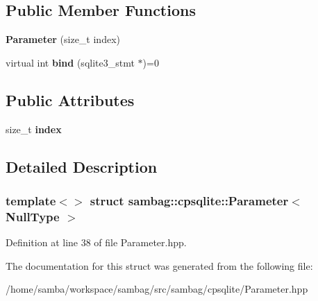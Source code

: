 \subsection*{Public Member Functions}
\begin{DoxyCompactItemize}
\item 
\hypertarget{structsambag_1_1cpsqlite_1_1_parameter_3_01_null_type_01_4_a1ea0b6f9d2697d99e6f2d6531f4bd075}{
{\bfseries Parameter} (size\_\-t index)}
\label{structsambag_1_1cpsqlite_1_1_parameter_3_01_null_type_01_4_a1ea0b6f9d2697d99e6f2d6531f4bd075}

\item 
\hypertarget{structsambag_1_1cpsqlite_1_1_parameter_3_01_null_type_01_4_a6d5826db5309ac05e7f267a4cf9835aa}{
virtual int {\bfseries bind} (sqlite3\_\-stmt $\ast$)=0}
\label{structsambag_1_1cpsqlite_1_1_parameter_3_01_null_type_01_4_a6d5826db5309ac05e7f267a4cf9835aa}

\end{DoxyCompactItemize}
\subsection*{Public Attributes}
\begin{DoxyCompactItemize}
\item 
\hypertarget{structsambag_1_1cpsqlite_1_1_parameter_3_01_null_type_01_4_a0f20eb15a9fa2a94b8ea1274ad76e99f}{
size\_\-t {\bfseries index}}
\label{structsambag_1_1cpsqlite_1_1_parameter_3_01_null_type_01_4_a0f20eb15a9fa2a94b8ea1274ad76e99f}

\end{DoxyCompactItemize}


\subsection{Detailed Description}
\subsubsection*{template$<$$>$ struct sambag::cpsqlite::Parameter$<$ NullType $>$}



Definition at line 38 of file Parameter.hpp.



The documentation for this struct was generated from the following file:\begin{DoxyCompactItemize}
\item 
/home/samba/workspace/sambag/src/sambag/cpsqlite/Parameter.hpp\end{DoxyCompactItemize}
